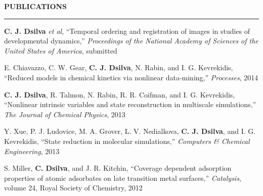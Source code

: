 \documentclass[letterpaper,10pt]{article}
\makeatletter
\newenvironment{itemize*}
  {\begin{itemize}
    \setlength{\parskip}{-3pt}}
  {\end{itemize}}
\newcommand{\cvheading}[1]{
\vspace{0.05in}
\noindent
\MakeUppercase{\bf #1}
\vspace{0.06in}
{\hrule height 0.3mm}
\vspace{0.06in}}
\newcommand{\workplace}[4]{
\noindent
\begin{tabular*}{1.0\textwidth}{@{\extracolsep{\fill}} l r}
{\bf #1} & #2\\
{\em #3} & #4\\
\end{tabular*}
}
\makeatother
\begin{document}



\cvheading{Publications}
\begin{itemize*}
\item {\bf C. J. Dsilva} {\it et al}, ``Temporal ordering and registration of images in studies of developmental dynamics,'' {\em Proceedings of the National Academy of Sciences of the United States of America}, submitted
\item E. Chiavazzo, C. W. Gear, {\bf C. J. Dsilva}, N. Rabin, and I. G. Kevrekidis, ``Reduced models in chemical kinetics via nonlinear data-mining,'' {\em Processes}, 2014
\item {\bf C. J. Dsilva}, R. Talmon, N. Rabin, R. R. Coifman, and I. G. Kevrekidis, ``Nonlinear intrinsic variables and state reconstruction in multiscale simulations,''
{\em The Journal of Chemical Physics}, 2013
\item Y. Xue, P. J. Ludovice, M. A. Grover, L. V. Nedialkova, {\bf C. J. Dsilva}, and I. G. Kevrekidis, ``State reduction in molecular simulations,'' {\em Computers \& Chemical Engineering}, 2013
\item S. Miller, {\bf C. Dsilva}, and J. R. Kitchin, ``Coverage dependent adsorption properties of atomic adsorbates on late transition metal surfaces,'' {\em Catalysis}, volume 24, Royal Society of Chemistry, 2012
\end{itemize*}
%
\end{document}
